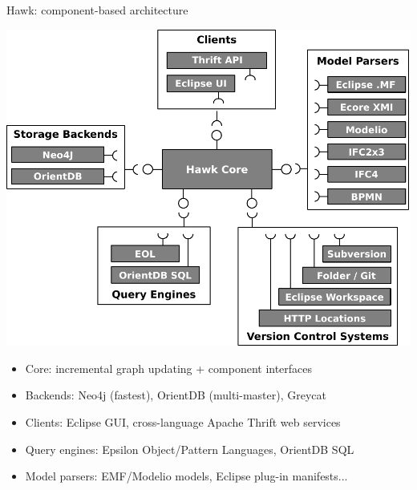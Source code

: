 \documentclass[10pt]{beamer}
\begin{document}
\begin{frame}{Hawk: component-based architecture}
  \begin{center}
    \includegraphics[width=.6\textwidth]{hawk-architecture}
  \end{center}

  \begin{itemize}
  \item Core: incremental graph updating + component interfaces
  \item Backends: Neo4j (fastest), OrientDB (multi-master), Greycat
  \item Clients: Eclipse GUI, cross-language Apache Thrift web services
  \item Query engines: Epsilon Object/Pattern Languages, OrientDB SQL
  \item Model parsers: EMF/Modelio models, Eclipse plug-in manifests...
  \end{itemize}
\end{frame}
\end{document}
